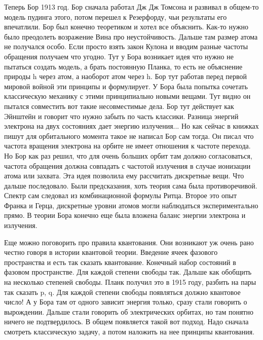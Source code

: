 \documentclass[a4paper, 12pt]{article}
\begin{document}
Теперь Бор 1913 год. Бор сначала работал Дж Дж Томсона и развивал 
в общем-то модель пудинга этого, потом перешел к Резерфорду, чьи 
результаты его впечатлили. Бор был конечно теоретиком и хотел все 
объяснить. Как-то нужно было преодолеть возражение Вина про 
неустойчивость. Дальше там размер атома не получался особо. Если просто 
взять закон Кулона и вводим разные частоты обращения получаем что 
угодно. Тут у Бора возникает идея что нужно не пытаться создать модель, 
а брать постоянную Планка, то есть не объяснение природы h через атом, 
а наоборот атом через h. Бор тут работав перед первой мировой войной эти 
принципы и формулирует. У Бора была попытка сочетать классическую 
механику с этими принципиально новыми вещами. Тут видно он пытался 
совместить вот такие несовместимые дела. Бор тут действует как Эйнштейн 
и говорит что нужно забыть по часть классики. Разница энергий электрона 
на двух состояниях дает энергию излучения... Но как сейчас в книжках 
пишут для орбитального момента такое не написал Бор сам тогда. Он писал 
что частота вращения электрона на орбите не имеет отношения к частоте 
перехода. Но Бор как раз решил, что для очень больших орбит там должно 
согласоваться, частота обращения должна совпадать с частотой излучения 
в случае ионизации атома или захвата. Эта идея позволила ему рассчитать 
дискретные вещи. Что дальше последовало. Были предсказания, хоть теория 
сама была противоречивой. Спектр сам следовал из комбинационной формулы 
Ритца. Второе это опыт Франка и Герца, дискретные уровни атомов могли 
наблюдаться экспериментально прямо. В теории Бора конечно еще была 
вложена баланс энергии электрона и излучения.

Еще можно поговорить про правила квантования. Они возникают уж очень 
рано честно говоря в истории квантовой теории. Введение ячеек фазового 
пространства и есть так сказать квантование. Конечный набор состояний 
в фазовом пространстве. Для каждой степени свободы так. Дальше как 
обобщить на несколько степеней свободы. Планк получил это в 1915 году, 
разбить на пары так сказать p, q. Для каждой степени свободы появляться 
должно квантовое число! А у Бора там от одного зависит энергия только, 
сразу стали говорить о вырождении. Дальше стали говорить об 
электрических орбитах, но там понятно ничего не подтвердилось. В общем 
появляется такой вот подход. Надо сначала смотреть классическую задачу, 
а потом наложить на нее принципы квантования.
\end{document}
